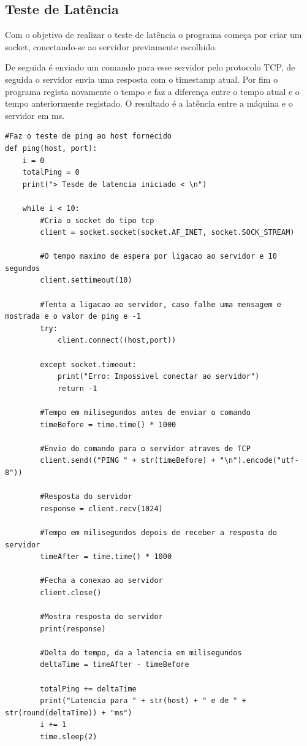 \documentclass{report}
\begin{document}
\subsection{Teste de Latência}
\par Com o objetivo de realizar o teste de latência o programa começa por criar um socket, conectando-se ao servidor previamente escolhido.
\par De seguida é enviado um comando para esse servidor pelo protocolo TCP\cite{tcp}, de seguida o servidor envia uma resposta com o timestamp atual.
Por fim o programa regista novamente o tempo e faz a diferença entre o tempo atual e o tempo anteriormente registado. O resultado é a latência entre a máquina e o servidor em \ac{ms}.
\begin{lstlisting}
#Faz o teste de ping ao host fornecido
def ping(host, port):
    i = 0
    totalPing = 0
    print("> Tesde de latencia iniciado < \n")

    while i < 10:
        #Cria o socket do tipo tcp
        client = socket.socket(socket.AF_INET, socket.SOCK_STREAM)

        #O tempo maximo de espera por ligacao ao servidor e 10 segundos
        client.settimeout(10)

        #Tenta a ligacao ao servidor, caso falhe uma mensagem e mostrada e o valor de ping e -1
        try:
            client.connect((host,port))

        except socket.timeout:
            print("Erro: Impossivel conectar ao servidor")
            return -1 
         
        #Tempo em milisegundos antes de enviar o comando
        timeBefore = time.time() * 1000

        #Envio do comando para o servidor atraves de TCP
        client.send(("PING " + str(timeBefore) + "\n").encode("utf-8"))
        
        #Resposta do servidor
        response = client.recv(1024)

        #Tempo em milisegundos depois de receber a resposta do servidor
        timeAfter = time.time() * 1000

        #Fecha a conexao ao servidor
        client.close()

        #Mostra resposta do servidor    
        print(response)

        #Delta do tempo, da a latencia em milisegundos
        deltaTime = timeAfter - timeBefore

        totalPing += deltaTime
        print("Latencia para " + str(host) + " e de " + str(round(deltaTime)) + "ms")
        i += 1
        time.sleep(2)


\end{lstlisting}
\end{document}
